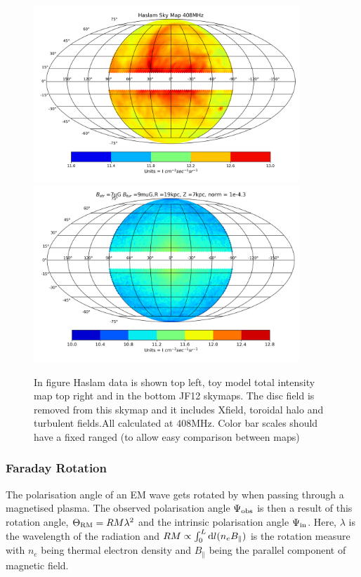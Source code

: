 \documentclass[12pt, a4 paper]{article}
\newcommand{\Andrew}[1]{\textcolor{dg}{#1}}
\begin{document}
\begin{figure}[h!]
    \centering
    \includegraphics[width = 10cm]{Images/Haslam_408MHz.png}
    \includegraphics[width =
    10cm]{Images/408MHz_TI_Spec_Ind_3.0_Bstr_7_Btur_9_R_19_Z_7_norm_4.3.png}
    \caption{In figure Haslam data is shown top left, toy model total intensity map top right and in the bottom JF12 skymaps. The disc field is removed from this skymap and it includes Xfield, toroidal halo and turbulent fields.All calculated at $408$MHz. \Andrew{Color bar scales should have a fixed ranged (to allow easy comparison between maps)}}
    \label{fig:my_label}
\end{figure}
\newpage


\iffalse

\subsubsection{Faraday Rotation}\label{Faraday_Rotation}
The polarisation angle of an EM wave gets rotated by when passing through a magnetised plasma. The observed polarisation angle $\Psi_{\rm obs }$ is then a result of this rotation angle, $\Theta_{\rm RM} = RM\lambda^2$ and the intrinsic polarisation angle $\Psi_{\rm in}$. Here, $\lambda$ is the wavelength of the radiation and $RM \propto \int_0^L {\rm d}l(n_e B_{\parallel})$ is the rotation measure with $n_e$ being thermal electron density and $B_{\parallel}$ being the parallel component of magnetic field.
\end{document}
